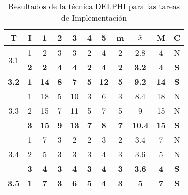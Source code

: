 \documentclass[11pt,a4paper,spanish,twoside]{report}
\begin{document}
\begin{table}[!h]
\centering
  \begin{tabular}{|c|c||c|c|c|c|c||c|c|c||c|}
    \hline
    \textbf{T} & \textbf{I} & \textbf{1} &
    \textbf{2} & \textbf{3} & \textbf{4} & \textbf{5} & \textbf{m}
    &\textbf{$\bar{x}$} &\textbf{M} & \textbf{C}\\    
    \hline \hline
    \multirow{2}{*}{3.1}& 1 & 2 & 3 & 3 & 2 & 4 & 2 & 2.8 & 4 & N \\
    & \textbf{2} & \textbf{2} & \textbf{4} & \textbf{4} & \textbf{2} & \textbf{4} & \textbf{2} & \textbf{3.2} & \textbf{4} & \textbf{S} \\
    \hline

    \textbf{3.2} & \textbf{1} & \textbf{14} & \textbf{8} & \textbf{7} & \textbf{5} & \textbf{12} & \textbf{5} & \textbf{9.2} & \textbf{14} & \textbf{S} \\
    \hline

    \multirow{3}{*}{3.3}& 1 & 18 & 5 & 10 & 3 & 6 & 3 & 8.4 & 18 & N \\
    & 2 & 15 & 7 & 11 & 5 & 7 & 5 & 9 & 15 & N \\
    & \textbf{3} & \textbf{15} & \textbf{9} & \textbf{13} & \textbf{7} & \textbf{8} & \textbf{7} & \textbf{10.4} & \textbf{15} & \textbf{S} \\
    \hline

    \multirow{3}{*}{3.4}& 1 & 7 & 3 & 2 & 2 & 3 & 2 & 3.4 & 7 & N \\
    & 2 & 5 & 3 & 3 & 3 & 4 & 3 & 3.6 & 5 & N \\
    & \textbf{3} & \textbf{4} & \textbf{3} & \textbf{4} & \textbf{3} & \textbf{4} & \textbf{3} & \textbf{3.6} & \textbf{4} & \textbf{S} \\
    \hline

    \textbf{3.5} & \textbf{1} & \textbf{7} & \textbf{3} & \textbf{6} & \textbf{5} & \textbf{4} & \textbf{3} & \textbf{5} &\textbf{7} & \textbf{S} \\
    \hline

  \end{tabular}
  \caption{Resultados de la técnica DELPHI para las tareas de
    Implementación} \label{Tab:imp}
\end{table}
\end{document}
